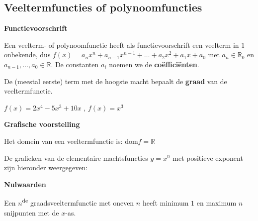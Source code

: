 \subsection{Veeltermfuncties of polynoomfuncties}
\label{sec:vtf}

\textbf{Functievoorschrift}

\begin{definitie}
	Een veelterm- of polynoomfunctie heeft als functievoorschrift een veelterm in 1 onbekende, dus
$f(x)=a_{n}x^{n}+a_{n-1}x^{n-1}+\ldots+a_{2}x^{2}+a_{1}x+a_{0}$
met $a_{n}\in\mathbb{R}_{0}$ en $a_{n-1},\ldots,a_{0}\in\mathbb{R}$. De constanten $a_{i}$ noemen we de \textbf{co\"effici\"enten}.

\end{definitie}

De (meestal eerste) term met de hoogste macht bepaalt de \textbf{graad} van de veeltermfunctie.

\begin{voorbeeld}
	$f(x)=2x^{4}-5x^{3}+10x$ , $f(x)=x^{3}$ 
\end{voorbeeld}

\textbf{Grafische voorstelling}

Het domein van een veeltermfunctie is: $\textrm{dom}f=\mathbb{R}$

De grafieken van de elementaire machtsfuncties $y=x^{n}$
met positieve exponent zijn hieronder weergegeven:





\textbf{Nulwaarden}

 Een $n$\textsuperscript{de} graadsveeltermfunctie met oneven
$n$ heeft minimum $1$ en maximum $n$ snijpunten met de $x$-as.

\begin{figure}[H]
	\centering 
	 
\end{figure}

\begin{figure}[H]
	\centering 
	 
\end{figure}


